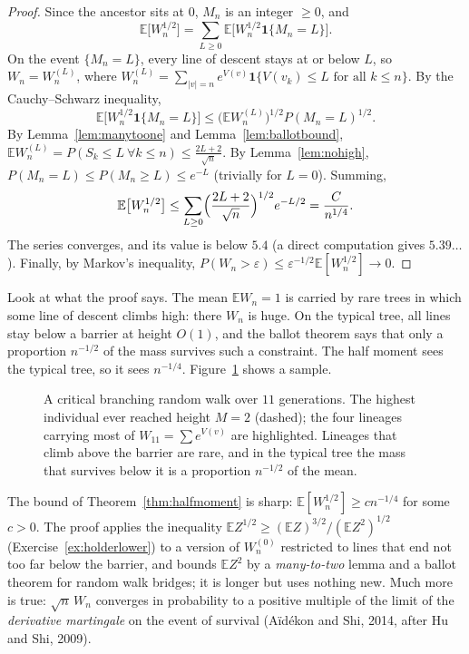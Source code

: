 \begin{proof}
Since the ancestor sits at $0$, $M_n$ is an integer $\ge0$, and
\[
\mathbb E\bigl[W_n^{1/2}\bigr]=\sum_{L\ge0}\mathbb E\bigl[W_n^{1/2}\mathbf 1\{M_n=L\}\bigr].
\]
On the event $\{M_n=L\}$, every line of descent stays at or below $L$, so $W_n=W_n^{(L)}$, where $W_n^{(L)}=\sum_{|v|=n}e^{V(v)}\mathbf 1\{V(v_k)\le L\text{ for all }k\le n\}$. By the Cauchy--Schwarz inequality,
\[
\mathbb E\bigl[W_n^{1/2}\mathbf 1\{M_n=L\}\bigr]\le\bigl(\mathbb EW_n^{(L)}\bigr)^{1/2}P(M_n=L)^{1/2}.
\]
By Lemma~\ref{lem:manytoone} and Lemma~\ref{lem:ballotbound}, $\mathbb EW_n^{(L)}=P(S_k\le L\ \forall k\le n)\le\frac{2L+2}{\sqrt n}$. By Lemma~\ref{lem:nohigh}, $P(M_n=L)\le P(M_n\ge L)\le e^{-L}$ (trivially for $L=0$). Summing,
\[
\mathbb E\bigl[W_n^{1/2}\bigr]\le\sum_{L\ge0}\Bigl(\frac{2L+2}{\sqrt n}\Bigr)^{1/2}e^{-L/2}=\frac C{n^{1/4}}.
\]
The series converges, and its value is below $5.4$ (a direct computation gives $5.39\ldots$). Finally, by Markov's inequality, $P(W_n>\varepsilon)\le\varepsilon^{-1/2}\mathbb E[W_n^{1/2}]\to0$.
\end{proof}

Look at what the proof says. The mean $\mathbb EW_n=1$ is carried by rare trees in which some line of descent climbs high: there $W_n$ is huge. On the typical tree, all lines stay below a barrier at height $O(1)$, and the ballot theorem says that only a proportion $n^{-1/2}$ of the mass survives such a constraint. The half moment sees the typical tree, so it sees $n^{-1/4}$. Figure~\ref{fig:barrier} shows a sample.

\begin{figure}[ht]\centering{}
\caption{A critical branching random walk over $11$ generations. The highest individual ever reached height $M=2$ (dashed); the four lineages carrying most of $W_{11}=\sum e^{V(v)}$ are highlighted. Lineages that climb above the barrier are rare, and in the typical tree the mass that survives below it is a proportion $n^{-1/2}$ of the mean.}\label{fig:barrier}
\end{figure}

\begin{remark}\label{rem:brwlower}
The bound of Theorem~\ref{thm:halfmoment} is sharp: $\mathbb E[W_n^{1/2}]\ge cn^{-1/4}$ for some $c>0$. The proof applies the inequality $\mathbb EZ^{1/2}\ge(\mathbb EZ)^{3/2}/(\mathbb EZ^2)^{1/2}$ (Exercise~\ref{ex:holderlower}) to a version of $W_n^{(0)}$ restricted to lines that end not too far below the barrier, and bounds $\mathbb EZ^2$ by a \emph{many-to-two} lemma and a ballot theorem for random walk bridges; it is longer but uses nothing new. Much more is true: $\sqrt n\,W_n$ converges in probability to a positive multiple of the limit of the \emph{derivative martingale} on the event of survival (Aïdékon and Shi, 2014, after Hu and Shi, 2009).
\end{remark}

